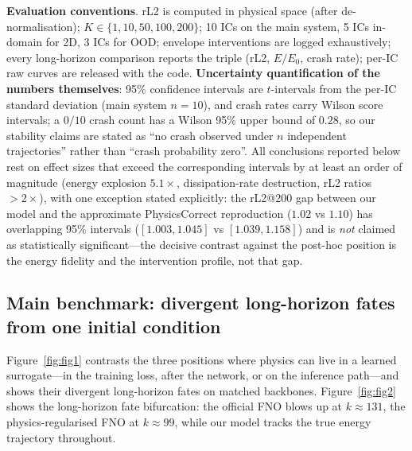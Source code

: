 \documentclass[11pt,a4paper]{article}
\begin{document}
\textbf{Evaluation conventions}. rL2 is computed in physical space (after de-normalisation); $K\in\{1,10,50,100,200\}$; 10 ICs on the main system, 5 ICs in-domain for 2D, 3 ICs for OOD; envelope interventions are logged exhaustively; every long-horizon comparison reports the triple (rL2, $E/E_0$, crash rate); per-IC raw curves are released with the code. \textbf{Uncertainty quantification of the numbers themselves}: 95\% confidence intervals are $t$-intervals from the per-IC standard deviation (main system $n{=}10$), and crash rates carry Wilson score intervals; a $0/10$ crash count has a Wilson 95\% upper bound of $0.28$, so our stability claims are stated as ``no crash observed under $n$ independent trajectories'' rather than ``crash probability zero''. All conclusions reported below rest on effect sizes that exceed the corresponding intervals by at least an order of magnitude (energy explosion $5.1\times$, dissipation-rate destruction, rL2 ratios $>2\times$), with one exception stated explicitly: the rL2@200 gap between our model and the approximate PhysicsCorrect reproduction ($1.02$ vs $1.10$) has overlapping 95\% intervals ($[1.003,1.045]$ vs $[1.039,1.158]$) and is \emph{not} claimed as statistically significant---the decisive contrast against the post-hoc position is the energy fidelity and the intervention profile, not that gap.

\subsection{Main benchmark: divergent long-horizon fates from one initial condition}\label{sec:main}

Figure~\ref{fig:fig1} contrasts the three positions where physics can live in a learned surrogate---in the training loss, after the network, or on the inference path---and shows their divergent long-horizon fates on matched backbones. Figure~\ref{fig:fig2} shows the long-horizon fate bifurcation: the official FNO blows up at $k\approx131$, the physics-regularised FNO at $k\approx99$, while our model tracks the true energy trajectory throughout.
\end{document}
